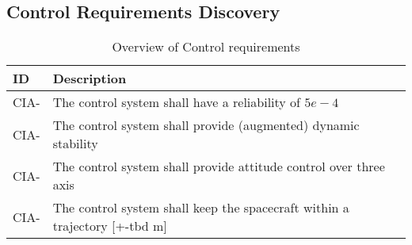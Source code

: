 \subsection{Control Requirements Discovery} \label{sec:req-control}


\begin{table}[H]
	\caption{Overview of Control requirements}
	\begin{tabular}{|p{}|p{}|}
		\hline
		ID         & Description                                                                                                      \\ \hline \hline
		CIA- &     The control system shall have a reliability of $5e-4$            						\\ \hline
		CIA- &     The control system shall provide (augmented) dynamic stability       					\\ \hline
		CIA- &     The control system shall provide attitude control over three axis         				\\ \hline
		CIA- &     The control system shall keep the spacecraft within a trajectory [+-\gls{tbd} m]       	\\ \hline		
	\end{tabular}
	\label{tab:controlreq}
\end{table}